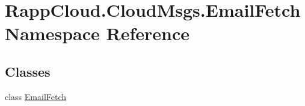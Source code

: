 \hypertarget{namespaceRappCloud_1_1CloudMsgs_1_1EmailFetch}{\section{Rapp\-Cloud.\-Cloud\-Msgs.\-Email\-Fetch Namespace Reference}
\label{namespaceRappCloud_1_1CloudMsgs_1_1EmailFetch}
}
\subsection*{Classes}
\begin{DoxyCompactItemize}
\item 
class \hyperlink{classRappCloud_1_1CloudMsgs_1_1EmailFetch_1_1EmailFetch}{Email\-Fetch}
\end{DoxyCompactItemize}
